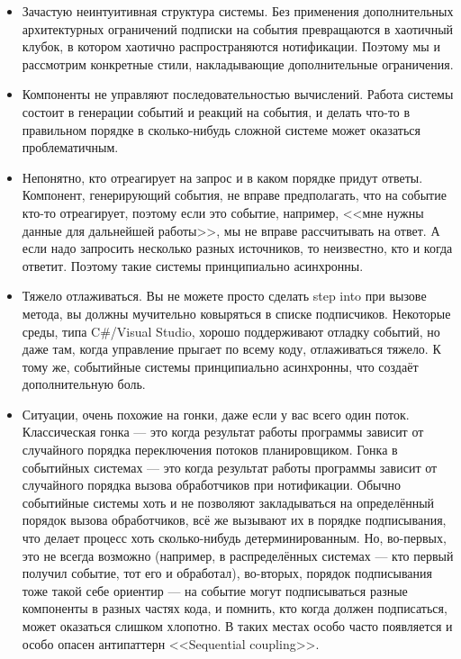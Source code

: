 \documentclass[a5paper]{article}
\begin{document}
\begin{itemize}
    \item Зачастую неинтуитивная структура системы. Без применения дополнительных архитектурных ограничений подписки на события превращаются в хаотичный клубок, в котором хаотично распространяются нотификации. Поэтому мы и рассмотрим конкретные стили, накладывающие дополнительные ограничения.
    \item Компоненты не управляют последовательностью вычислений. Работа системы состоит в генерации событий и реакций на события, и делать что-то в правильном порядке в сколько-нибудь сложной системе может оказаться проблематичным.
    \item Непонятно, кто отреагирует на запрос и в каком порядке придут ответы. Компонент, генерирующий события, не вправе предполагать, что на событие кто-то отреагирует, поэтому если это событие, например, <<мне нужны данные для дальнейшей работы>>, мы не вправе рассчитывать на ответ. А если надо запросить несколько разных источников, то неизвестно, кто и когда ответит. Поэтому такие системы принципиально асинхронны.
    \item Тяжело отлаживаться. Вы не можете просто сделать step into при вызове метода, вы должны мучительно ковыряться в списке подписчиков. Некоторые среды, типа C\#/Visual Studio, хорошо поддерживают отладку событий, но даже там, когда управление прыгает по всему коду, отлаживаться тяжело. К тому же, событийные системы принципиально асинхронны, что создаёт дополнительную боль.
    \item Ситуации, очень похожие на гонки, даже если у вас всего один поток. Классическая гонка --- это когда результат работы программы зависит от случайного порядка переключения потоков планировщиком. Гонка в событийных системах --- это когда результат работы программы зависит от случайного порядка вызова обработчиков при нотификации. Обычно событийные системы хоть и не позволяют закладываться на определённый порядок вызова обработчиков, всё же вызывают их в порядке подписывания, что делает процесс хоть сколько-нибудь детерминированным. Но, во-первых, это не всегда возможно (например, в распределённых системах --- кто первый получил событие, тот его и обработал), во-вторых, порядок подписывания тоже такой себе ориентир --- на событие могут подписываться разные компоненты в разных частях кода, и помнить, кто когда должен подписаться, может оказаться слишком хлопотно. В таких местах особо часто появляется и особо опасен антипаттерн <<Sequential coupling>>.
\end{itemize}
\end{document}
